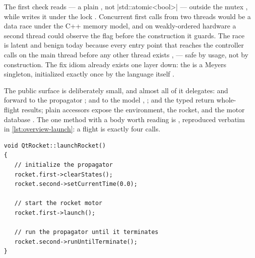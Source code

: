 \begin{keyinsight}
The first check reads  --- a plain , not
\cppinline|std::atomic<bool>| --- outside the mutex , while
 writes it under the lock . Concurrent first calls from
two threads would be a data race under the C++ memory model, and on weakly-ordered
hardware a second thread could observe the flag before the construction it guards. The
race is latent and benign today because every entry point that reaches the controller
calls  on the main thread before any other thread exists ,
 --- safe by usage, not by construction. The fix idiom already
exists one layer down: the  is a Meyers singleton, initialized exactly once
by the language itself .
\end{keyinsight}

The public surface is deliberately small, and almost all of it delegates:
 and  forward to the propagator
;  and  to the model
, ; 
 and the typed   return
whole-flight results; plain accessors expose the environment, the rocket, and the motor
database . The one method with a body worth reading is
 , reproduced verbatim in
\cref{lst:overview-launch}: a flight is exactly four calls.

\begin{listing}[htbp]
\begin{verbatim}
void QtRocket::launchRocket()
{
   // initialize the propagator
   rocket.first->clearStates();
   rocket.second->setCurrentTime(0.0);

   // start the rocket motor
   rocket.first->launch();

   // run the propagator until it terminates
   rocket.second->runUntilTerminate();
}
\end{verbatim}
\caption{The entire launch path in the controller : clear the
recorded history, rewind simulation time, ignite the model, run the loop to termination.
Everything else --- staging launch parameters, selecting models, exporting results ---
lives in the front ends.}\label{lst:overview-launch}
\end{listing}

